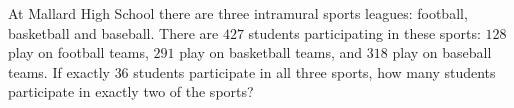 At Mallard High School there are three intramural sports leagues: football, basketball and baseball. There are $427$ students participating in these sports: $128$ play on football teams, $291$ play on basketball teams, and $318$ play on baseball teams. If exactly $36$ students participate in all three sports, how many students participate in exactly two of the sports?
